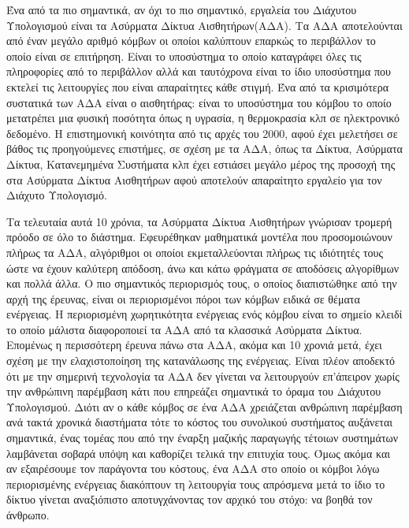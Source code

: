 Ένα από τα πιο σημαντικά, αν όχι το πιο σημαντικό, εργαλεία του Διάχυτου Υπολογισμού είναι τα Ασύρματα Δίκτυα Αισθητήρων(ΑΔΑ).
Τα ΑΔΑ αποτελούνται από έναν μεγάλο αριθμό κόμβων οι οποίοι καλύπτουν επαρκώς το περιβάλλον το οποίο είναι σε επιτήρηση.
Είναι το υποσύστημα το οποίο καταγράφει όλες τις πληροφορίες από το περιβάλλον αλλά και ταυτόχρονα είναι το ίδιο υποσύστημα που εκτελεί τις λειτουργίες που είναι
απαραίτητες κάθε στιγμή.
Ένα από τα κρισιμότερα συστατικά των ΑΔΑ είναι ο αισθητήρας: είναι το υποσύστημα του κόμβου το οποίο μετατρέπει μια φυσική ποσότητα όπως η υγρασία, η θερμοκρασία
κλπ σε ηλεκτρονικό δεδομένο.
Η επιστημονική κοινότητα από τις αρχές του 2000, αφού έχει μελετήσει σε βάθος τις προηγούμενες επιστήμες, σε σχέση με τα ΑΔΑ, όπως τα Δίκτυα, Ασύρματα Δίκτυα,
Κατανεμημένα Συστήματα κλπ έχει εστιάσει μεγάλο μέρος της προσοχή της στα Ασύρματα Δίκτυα Αισθητήρων αφού αποτελούν απαραίτητο εργαλείο για τον Διάχυτο Υπολογισμό.


Τα τελευταία αυτά 10 χρόνια, τα Ασύρματα Δίκτυα Αισθητήρων γνώρισαν τρομερή πρόοδο σε όλο το διάστημα. Εφευρέθηκαν μαθηματικά μοντέλα που προσομοιώνουν πλήρως τα
ΑΔΑ\cite{geometric_graphs}, αλγόριθμοι οι οποίοι εκμεταλλεύονται πλήρως τις ιδιότητές τους ώστε να έχουν καλύτερη απόδοση, άνω και κάτω φράγματα σε αποδόσεις
αλγορίθμων και πολλά άλλα.
Ο πιο σημαντικός περιορισμός τους, ο οποίος διαπιστώθηκε από την αρχή της έρευνας, είναι οι περιορισμένοι πόροι των κόμβων ειδικά σε θέματα ενέργειας.
Η περιορισμένη χωρητικότητα ενέργειας ενός κόμβου είναι το σημείο κλειδί το οποίο μάλιστα διαφοροποιεί τα ΑΔΑ από τα κλασσικά Ασύρματα Δίκτυα.
Επομένως η περισσότερη έρευνα πάνω στα ΑΔΑ, ακόμα και 10 χρονιά μετά, έχει σχέση με την ελαχιστοποίηση της κατανάλωσης της ενέργειας. Είναι πλέον αποδεκτό ότι με την
σημερινή τεχνολογία τα ΑΔΑ δεν γίνεται να λειτουργούν επ'άπειρον χωρίς την ανθρώπινη παρέμβαση κάτι που επηρεάζει σημαντικά το όραμα του Διάχυτου Υπολογισμού.
Διότι αν ο κάθε κόμβος σε ένα ΑΔΑ χρειάζεται ανθρώπινη παρέμβαση ανά τακτά χρονικά διαστήματα τότε το κόστος του συνολικού συστήματος αυξάνεται σημαντικά, ένας τομέας
που από την έναρξη μαζικής παραγωγής τέτοιων συστημάτων λαμβάνεται σοβαρά υπόψη και καθορίζει τελικά την επιτυχία τους. Όμως ακόμα και αν εξαιρέσουμε τον παράγοντα
του κόστους, ένα ΑΔΑ στο οποίο οι κόμβοι λόγω περιορισμένης ενέργειας διακόπτουν τη λειτουργία τους απρόσμενα μετά το ίδιο το δίκτυο γίνεται αναξιόπιστο
αποτυγχάνοντας τον αρχικό του στόχο: να βοηθά τον άνθρωπο.

